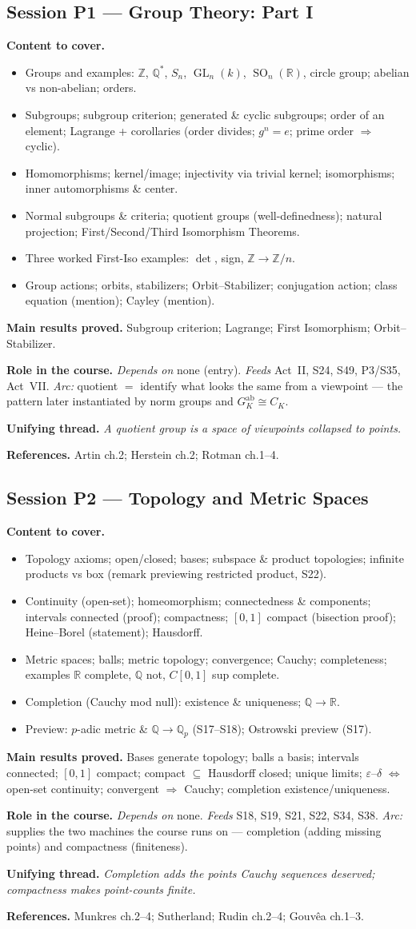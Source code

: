 \documentclass[11pt,a4paper]{article}
\newcommand{\sess}[2]{\subsection[#1. #2]{Session #1 --- #2}}
\newcommand{\chead}{\par\smallskip\noindent\textbf{Content to cover.}}
\newcommand{\proved}[1]{\par\smallskip\noindent\textbf{Main results proved.} #1}
\newcommand{\role}[1]{\par\smallskip\noindent\textbf{Role in the course.} #1}
\newcommand{\thread}[1]{\par\smallskip\noindent\textbf{Unifying thread.} \textit{#1}}
\newcommand{\srefs}[1]{\par\smallskip\noindent\textbf{References.} #1}
\newcommand{\Z}{\mathbb{Z}}
\newcommand{\Q}{\mathbb{Q}}
\newcommand{\R}{\mathbb{R}}
\newcommand{\GL}{\operatorname{GL}}
\newcommand{\SO}{\operatorname{SO}}
\begin{document}
	\sess{P1}{Group Theory: Part I}
	\chead
	\begin{itemize}
		\item Groups and examples: $\Z$, $\Q^*$, $S_n$, $\GL_n(k)$, $\SO_n(\R)$, circle group; abelian vs non-abelian; orders.
		\item Subgroups; subgroup criterion; generated \& cyclic subgroups; order of an element; Lagrange + corollaries (order divides; $g^n=e$; prime order $\Rightarrow$ cyclic).
		\item Homomorphisms; kernel/image; injectivity via trivial kernel; isomorphisms; inner automorphisms \& center.
		\item Normal subgroups \& criteria; quotient groups (well-definedness); natural projection; First/Second/Third Isomorphism Theorems.
		\item Three worked First-Iso examples: $\det$, sign, $\Z\to\Z/n$.
		\item Group actions; orbits, stabilizers; Orbit--Stabilizer; conjugation action; class equation (mention); Cayley (mention).
	\end{itemize}
	\proved{Subgroup criterion; Lagrange; First Isomorphism; Orbit--Stabilizer.}
	\role{\emph{Depends on} none (entry). \emph{Feeds} Act~II, S24, S49, P3/S35, Act~VII. \emph{Arc:} quotient $=$ identify what looks the same from a viewpoint --- the pattern later instantiated by norm groups and $G_K^{\mathrm{ab}}\cong C_K$.}
	\thread{A quotient group is a space of viewpoints collapsed to points.}
	\srefs{Artin ch.2; Herstein ch.2; Rotman ch.1--4.}
	
	\sess{P2}{Topology and Metric Spaces}
	\chead
	\begin{itemize}
		\item Topology axioms; open/closed; bases; subspace \& product topologies; infinite products vs box (remark previewing restricted product, S22).
		\item Continuity (open-set); homeomorphism; connectedness \& components; intervals connected (proof); compactness; $[0,1]$ compact (bisection proof); Heine--Borel (statement); Hausdorff.
		\item Metric spaces; balls; metric topology; convergence; Cauchy; completeness; examples $\R$ complete, $\Q$ not, $C[0,1]$ sup complete.
		\item Completion (Cauchy mod null): existence \& uniqueness; $\Q\to\R$.
		\item Preview: $p$-adic metric \& $\Q\to\Q_p$ (S17--S18); Ostrowski preview (S17).
	\end{itemize}
	\proved{Bases generate topology; balls a basis; intervals connected; $[0,1]$ compact; compact $\subseteq$ Hausdorff closed; unique limits; $\varepsilon$--$\delta$ $\iff$ open-set continuity; convergent $\Rightarrow$ Cauchy; completion existence/uniqueness.}
	\role{\emph{Depends on} none. \emph{Feeds} S18, S19, S21, S22, S34, S38. \emph{Arc:} supplies the two machines the course runs on --- completion (adding missing points) and compactness (finiteness).}
	\thread{Completion adds the points Cauchy sequences deserved; compactness makes point-counts finite.}
	\srefs{Munkres ch.2--4; Sutherland; Rudin ch.2--4; Gouv\^ea ch.1--3.}
	
\end{document}
